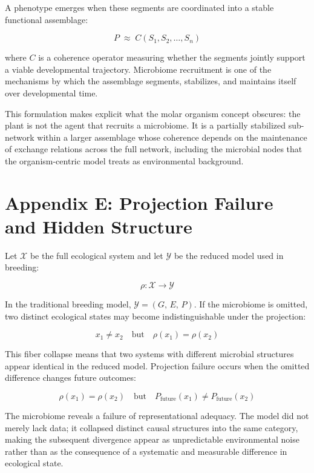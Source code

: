 \documentclass[11pt, a4paper]{article}
\begin{document}
A phenotype emerges when these segments are coordinated into a stable functional assemblage:

\[
P \;\approx\; C(S_1, S_2, \ldots, S_n)
\]

where $C$ is a coherence operator measuring whether the segments jointly support a viable developmental trajectory. Microbiome recruitment is one of the mechanisms by which the assemblage segments, stabilizes, and maintains itself over developmental time.

This formulation makes explicit what the molar organism concept obscures: the plant is not the agent that recruits a microbiome. It is a partially stabilized sub-network within a larger assemblage whose coherence depends on the maintenance of exchange relations across the full network, including the microbial nodes that the organism-centric model treats as environmental background.

\bigskip
{}
\section*{Appendix E: Projection Failure and Hidden Structure}

Let $\mathcal{X}$ be the full ecological system and let $\mathcal{Y}$ be the reduced model used in breeding:

\[
\rho : \mathcal{X} \to \mathcal{Y}
\]

In the traditional breeding model, $\mathcal{Y} = (G,\, E,\, P)$. If the microbiome is omitted, two distinct ecological states may become indistinguishable under the projection:

\[
x_1 \neq x_2 \quad \text{but} \quad \rho(x_1) = \rho(x_2)
\]

This fiber collapse means that two systems with different microbial structures appear identical in the reduced model. Projection failure occurs when the omitted difference changes future outcomes:

\[
\rho(x_1) = \rho(x_2) \quad \text{but} \quad P_{\mathrm{future}}(x_1) \neq P_{\mathrm{future}}(x_2)
\]

The microbiome reveals a failure of representational adequacy. The model did not merely lack data; it collapsed distinct causal structures into the same category, making the subsequent divergence appear as unpredictable environmental noise rather than as the consequence of a systematic and measurable difference in ecological state.
\end{document}
